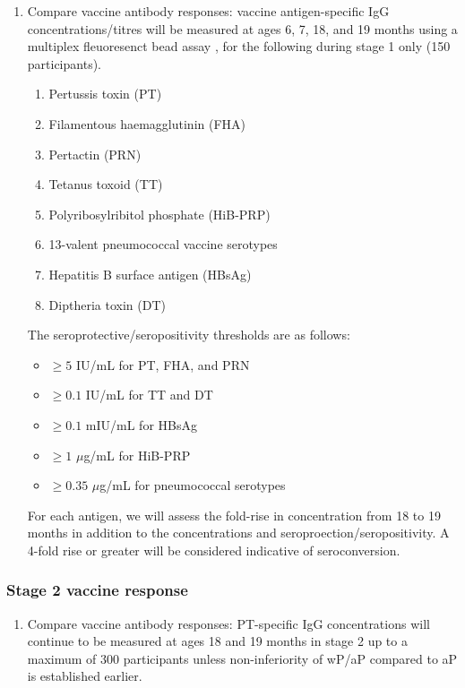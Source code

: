 \documentclass{bmcart}
\begin{document}
\begin{enumerate}[resume]
	\item Compare vaccine antibody responses:
	vaccine antigen-specific IgG concentrations/titres will be measured at ages 6, 7, 18, and 19 months using a multiplex fleuoresenct bead assay \cite{van2008development}, for the following during stage 1 only (150 participants).
	\begin{enumerate}
		\item Pertussis toxin (PT)
		\item Filamentous haemagglutinin (FHA)
		\item Pertactin (PRN)
		\item Tetanus toxoid (TT)
		\item Polyribosylribitol phosphate (HiB-PRP)
		\item 13-valent pneumococcal vaccine serotypes
		\item Hepatitis B surface antigen (HBsAg)
		\item Diptheria toxin (DT)
	\end{enumerate}
	The seroprotective/seropositivity thresholds are as follows:
	\begin{itemize}
		\item $\geq 5$ IU/mL for PT, FHA, and PRN
		\item $\geq 0.1$ IU/mL  for TT \cite{whotetanus} and DT
		\item $\geq 0.1$ mIU/mL for HBsAg
		\item $\geq 1$ $\mu$g/mL for HiB-PRP \cite{kayhty1983protective}
		\item $\geq 0.35$ $\mu$g/mL for pneumococcal serotypes \cite{siber2007estimating,whopneumo}
	\end{itemize}
	For each antigen, we will assess the fold-rise in concentration from 18 to 19 months in addition to the concentrations and seroproection/seropositivity.
	A 4-fold rise or greater will be considered indicative of seroconversion.
\end{enumerate}

\subsubsection*{Stage 2 vaccine response}

\begin{enumerate}[resume]
	\item Compare vaccine antibody responses:
	PT-specific IgG concentrations will continue to be measured at ages 18 and 19 months in stage 2 up to a maximum of 300 participants 
	unless non-inferiority of wP/aP compared to aP is established earlier.
\end{enumerate}
\end{document}

